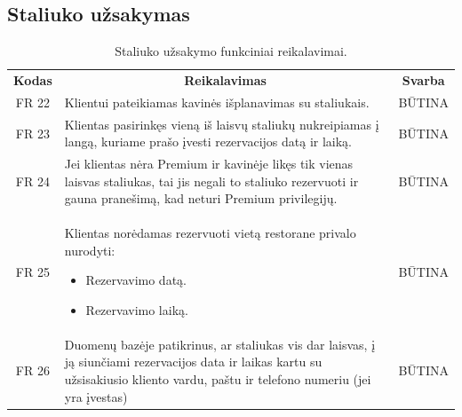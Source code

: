 \documentclass{VUMIFPSkursinis}
\begin{document}
\pagebreak


\subsection{Staliuko užsakymas}
\begin{center}
	\begin{table}[H]
	\caption{Staliuko užsakymo funkciniai reikalavimai.}
	\begin{tabular}{|p{2cm}|p{}|p{}|}
	
	\hline
	    \rowcolor{lightgray}
		\multicolumn{3}{|c|}{Staliuko užsakymas}\\
		
	\hline
		\multicolumn{1}{|c|}{{\bfseries Kodas}}&
		\multicolumn{1}{|c|}{{\bfseries Reikalavimas}}&
		\multicolumn{1}{|c|}{{\bfseries Svarba}}\\

	\hline
	
		\multicolumn{1}{|c|}{FR 22}&
		{Klientui pateikiamas kavinės išplanavimas su staliukais.}&
		\multicolumn{1}{|c|}{BŪTINA}\\				
	\hline
	
		\multicolumn{1}{|c|}{FR 23}&
		{Klientas pasirinkęs vieną iš laisvų staliukų nukreipiamas į langą, kuriame prašo įvesti rezervacijos datą ir laiką.}&
		\multicolumn{1}{|c|}{BŪTINA}\\				
	\hline
	
		\multicolumn{1}{|c|}{FR 24}&
		{Jei klientas nėra Premium ir kavinėje likęs tik vienas laisvas staliukas, tai jis negali to staliuko rezervuoti ir gauna pranešimą, kad neturi Premium privilegijų.}&
		\multicolumn{1}{|c|}{BŪTINA}\\				
	\hline
	
		\multicolumn{1}{|c|}{FR 25}&
		{Klientas norėdamas rezervuoti vietą restorane privalo nurodyti:
			\begin{itemize}
				\item Rezervavimo datą.
				\item Rezervavimo laiką.
			\end{itemize}}&
			\multicolumn{1}{|c|}{BŪTINA}\\				
	\hline
	
		\multicolumn{1}{|c|}{FR 26}&
		{Duomenų bazėje patikrinus, ar staliukas vis dar laisvas, į ją siunčiami rezervacijos data ir laikas kartu su užsisakiusio kliento vardu, paštu ir telefono numeriu (jei yra įvestas)}&
		\multicolumn{1}{|c|}{BŪTINA}\\				
	\hline
	
			
	
	\end{tabular}		
	
	\label{table:StaliukoUžsakymas}
	\end{table}


\end{center}
\end{document}
